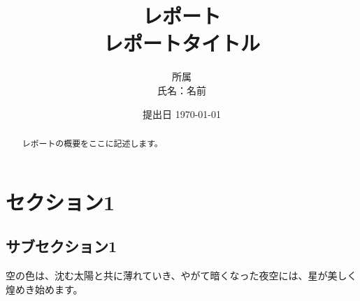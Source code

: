 \documentclass[autodetect-engine,dvipdfmx-if-dvi,ja=standard,a4paper,12pt]{bxjsarticle}
\begin{document}
\title{レポート \\
  レポートタイトル
}
\date{提出日 \today}
\author{所属 \\
  氏名：名前}

\maketitle
\begin{abstract}
  レポートの概要をここに記述します。
\end{abstract}

\newpage


\section{セクション1}
\subsection{サブセクション1}

空の色は、沈む太陽と共に薄れていき、やがて暗くなった夜空には、星が美しく煌めき始めます。

% 
% 
\end{document}
